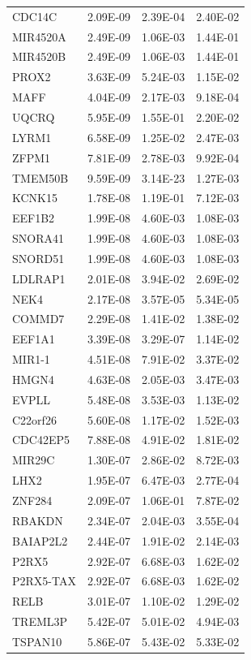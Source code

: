 \begin{longtable}{lrrr}
CDC14C & 2.09E-09 & 2.39E-04 & 2.40E-02\\
MIR4520A & 2.49E-09 & 1.06E-03 & 1.44E-01\\
MIR4520B & 2.49E-09 & 1.06E-03 & 1.44E-01\\
PROX2 & 3.63E-09 & 5.24E-03 & 1.15E-02\\
MAFF & 4.04E-09 & 2.17E-03 & 9.18E-04\\
UQCRQ & 5.95E-09 & 1.55E-01 & 2.20E-02\\
LYRM1 & 6.58E-09 & 1.25E-02 & 2.47E-03\\
ZFPM1 & 7.81E-09 & 2.78E-03 & 9.92E-04\\
TMEM50B & 9.59E-09 & 3.14E-23 & 1.27E-03\\
KCNK15 & 1.78E-08 & 1.19E-01 & 7.12E-03\\
EEF1B2 & 1.99E-08 & 4.60E-03 & 1.08E-03\\
SNORA41 & 1.99E-08 & 4.60E-03 & 1.08E-03\\
SNORD51 & 1.99E-08 & 4.60E-03 & 1.08E-03\\
LDLRAP1 & 2.01E-08 & 3.94E-02 & 2.69E-02\\
NEK4 & 2.17E-08 & 3.57E-05 & 5.34E-05\\
COMMD7 & 2.29E-08 & 1.41E-02 & 1.38E-02\\
EEF1A1 & 3.39E-08 & 3.29E-07 & 1.14E-02\\
MIR1-1 & 4.51E-08 & 7.91E-02 & 3.37E-02\\
HMGN4 & 4.63E-08 & 2.05E-03 & 3.47E-03\\
EVPLL & 5.48E-08 & 3.53E-03 & 1.13E-02\\
C22orf26 & 5.60E-08 & 1.17E-02 & 1.52E-03\\
CDC42EP5 & 7.88E-08 & 4.91E-02 & 1.81E-02\\
MIR29C & 1.30E-07 & 2.86E-02 & 8.72E-03\\
LHX2 & 1.95E-07 & 6.47E-03 & 2.77E-04\\
ZNF284 & 2.09E-07 & 1.06E-01 & 7.87E-02\\
RBAKDN & 2.34E-07 & 2.04E-03 & 3.55E-04\\
BAIAP2L2 & 2.44E-07 & 1.91E-02 & 2.14E-03\\
P2RX5 & 2.92E-07 & 6.68E-03 & 1.62E-02\\
P2RX5-TAX & 2.92E-07 & 6.68E-03 & 1.62E-02\\
RELB & 3.01E-07 & 1.10E-02 & 1.29E-02\\
TREML3P & 5.42E-07 & 5.01E-02 & 4.94E-03\\
TSPAN10 & 5.86E-07 & 5.43E-02 & 5.33E-02\\

\end{longtable}
